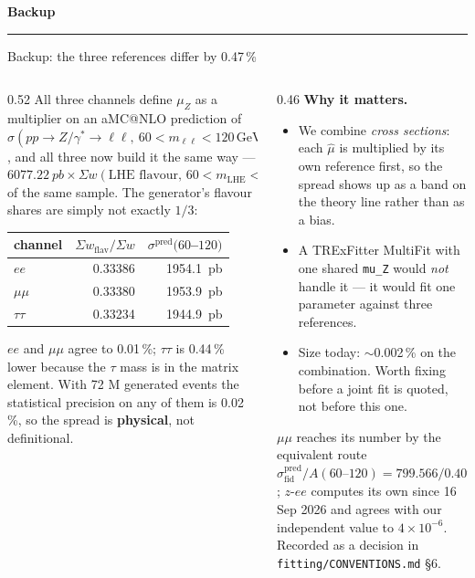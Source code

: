 \documentclass[aspectratio=169,9pt,t]{beamer}
\newcommand{\Z}{\ensuremath{Z/\gamma^{*}}}
\newcommand{\muZ}{\ensuremath{\mu_{Z}}}
\newcommand{\mll}{\ensuremath{m_{\ell\ell}}}
\newcommand{\sigll}{\ensuremath{\sigma(pp\to\Z\to\ell\ell,\ 60<\mll<120\,\mathrm{GeV})}}
\newcommand{\src}[1]{{\scriptsize\color{gray}\texttt{#1}}}
\begin{document}
\appendix

\begin{frame}
\centering\vfill
{\Large\color{comb}\textbf{Backup}}\\[3mm]
{\color{gray}\rule{0.25\textwidth}{0.5pt}}
\vfill
\end{frame}

\begin{frame}[noframenumbering]{Backup: the three references differ by 0.47\,\%}
\begin{columns}[T]
\begin{column}{0.52\textwidth}\small
All three channels define \muZ{} as a multiplier on an aMC@NLO prediction of $\sigll$, and all
three now build it the same way --- $\SI{6077.22}{pb} \times \Sigma w(\text{LHE flavour},\,
60 < m_{\text{LHE}} < 120)/\Sigma w$ of the same sample. The generator's flavour shares are simply
not exactly $1/3$:
\begin{center}\scriptsize
\begin{tabular}{@{}lrr@{}}
\toprule
channel & $\Sigma w_{\text{flav}}/\Sigma w$ & $\sigma^{\text{pred}}(60$--$120)$ \\ \midrule
\textcolor{ee}{$ee$} & 0.33386 & \SI{1954.1}{pb} \\
\textcolor{mumu}{$\mu\mu$} & 0.33380 & \SI{1953.9}{pb} \\
\textcolor{tautau}{$\tau\tau$} & 0.33234 & \SI{1944.9}{pb} \\
\bottomrule
\end{tabular}
\end{center}
$ee$ and $\mu\mu$ agree to 0.01\,\%; $\tau\tau$ is 0.44\,\% lower because the $\tau$ mass is in
the matrix element. With 72 M generated events the statistical precision on any of them is
0.02\,\%, so the spread is \textbf{physical}, not definitional.
\end{column}
\begin{column}{0.46\textwidth}\small
\textbf{Why it matters.}
\begin{itemize}\setlength\itemsep{1pt}
\item We combine \emph{cross sections}: each $\hat\mu$ is multiplied by its own reference first,
      so the spread shows up as a band on the theory line rather than as a bias.
\item A TRExFitter MultiFit with one shared \texttt{mu\_Z} would \emph{not} handle it --- it would
      fit one parameter against three references.
\item Size today: $\sim$0.002\,\% on the combination. Worth fixing before a joint fit is quoted,
      not before this one.
\end{itemize}
\medskip
$\mu\mu$ reaches its number by the equivalent route
$\sigma^{\text{pred}}_{\text{fid}}/A(60\text{--}120) = 799.566/0.409209$; $z$-$ee$ computes its
own since 16 Sep 2026 and agrees with our independent value to $4\times10^{-6}$.
\medskip
Recorded as a decision in \src{fitting/CONVENTIONS.md} \S6.
\end{column}
\end{columns}
\end{frame}
\end{document}
